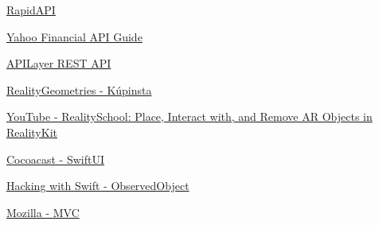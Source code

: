 \documentclass{report}
\begin{document}
\hyperlink{https://rapidapi.com/apidojo/api/yahoo-finance1}{RapidAPI}

\hyperlink{https://algotrading101.com/learn/yahoo-finance-api-guide/}{Yahoo Financial API Guide}

\hyperlink{https://apilayer.com/marketplace/exchangerates_data-api}{APILayer REST API}

\hyperlink{https://github.com/maxxfrazer/RealityGeometries}{RealityGeometries - Kúpinsta}

\hyperlink{https://www.youtube.com/watch?v=itGRaAryUxA}{YouTube - RealitySchool: Place, Interact with, and Remove AR Objects in RealityKit}

\hyperlink{https://cocoacasts.com/swiftui-fundamentals-what-is-swiftui}{Cocoacast - SwiftUI}

\hyperlink{https://www.hackingwithswift.com/quick-start/swiftui/how-to-use-observedobject-to-manage-state-from-external-objects}{Hacking with Swift - ObservedObject}

\hyperlink{https://developer.mozilla.org/en-US/docs/Glossary/MVC}{Mozilla - MVC}
\end{document}
